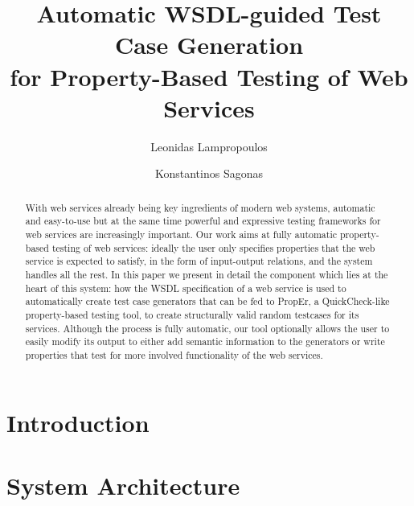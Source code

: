 \documentclass[submission,copyright,a4]{eptcs}
\title{Automatic WSDL-guided Test Case Generation\\
       for Property-Based Testing of Web Services}
\author{Leonidas Lampropoulos \and Konstantinos Sagonas}
\begin{document}
\maketitle

\begin{abstract}
With web services already being key ingredients of modern web systems,
automatic and easy-to-use but at the same time powerful and expressive
testing frameworks for web services are increasingly important. Our
work aims at fully automatic property-based testing of web services:
ideally the user only specifies properties that the web service is
expected to satisfy, in the form of input-output relations, and the
system handles all the rest. In this paper we present in detail the
component which lies at the heart of this system: how the WSDL
specification of a web service is used to automatically create test
case generators that can be fed to PropEr, a QuickCheck-like
property-based testing tool, to create structurally valid random
testcases for its services. Although the process is fully automatic,
our tool optionally allows the user to easily modify its output to
either add semantic information to the generators or write properties
that test for more involved functionality of the web services.
\end{abstract}


\section{Introduction}



\section{System Architecture}
\end{document}
